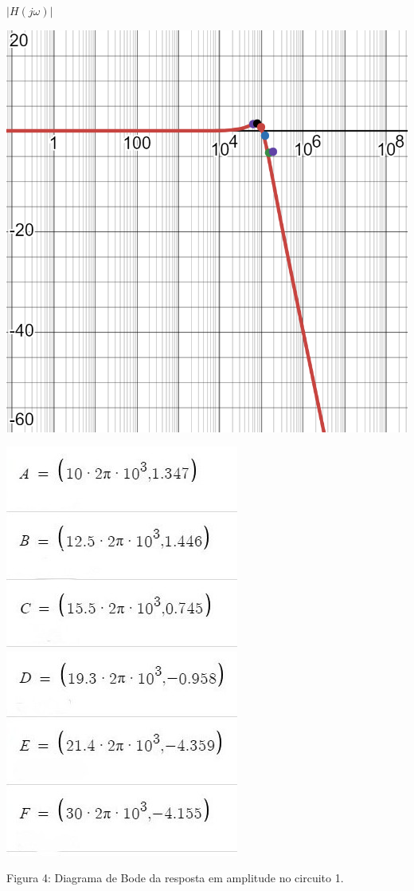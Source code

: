 \documentclass[a4 paper]{article}
\begin{document}
\textbf{$|H(j\omega)|$}
\begin{table}[h]
\centering
\includegraphics[scale=0.45]{figuras/bode-circ1}
\end{table}\vspace{-9.75cm}\marginpar{\textbf{$\omega$}}
\vspace{9.75cm}
\begin{table}[hb]
\centering
\includegraphics[scale=0.6]{figuras/pontosamplitude1-1}\includegraphics[scale=0.56]{figuras/pontosamplitude1}
\end{table}
\begin{center}
Figura 4: Diagrama de Bode da resposta em amplitude no circuito 1.
\end{center}
\end{document}
